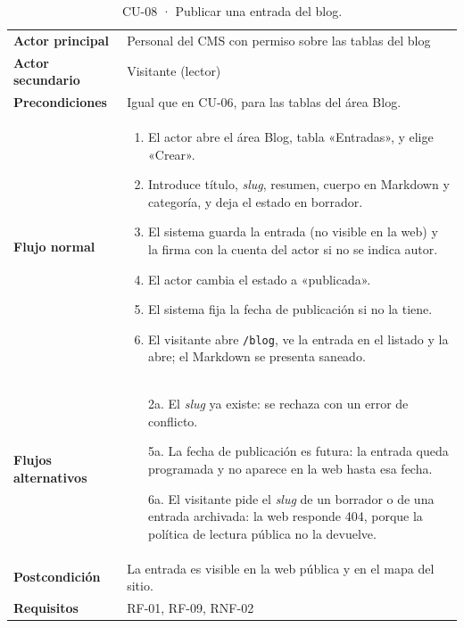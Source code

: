 {\footnotesize
\begin{xltabular}{\textwidth}{@{}>{\bfseries}p{2.6cm}X@{}}
  \caption{CU-08 · Publicar una entrada del blog.}\label{tab:ana-cu08}\\
    \toprule
    Actor principal & Personal del CMS con permiso sobre las tablas del blog \\
    Actor secundario & Visitante (lector) \\
    Precondiciones & Igual que en CU-06, para las tablas del área Blog. \\
    \midrule
    Flujo normal &
      \begin{enumerate}[nosep,leftmargin=*]
        \item El actor abre el área Blog, tabla «Entradas», y elige «Crear».
        \item Introduce título, \textit{slug}, resumen, cuerpo en Markdown y categoría, y deja el estado en borrador.
        \item El sistema guarda la entrada (no visible en la web) y la firma con la cuenta del actor si no se indica autor.
        \item El actor cambia el estado a «publicada».
        \item El sistema fija la fecha de publicación si no la tiene.
        \item El visitante abre \texttt{/blog}, ve la entrada en el listado y la abre; el Markdown se presenta saneado.
      \end{enumerate} \\
    \midrule
    Flujos alternativos &
      \begin{itemize}[nosep,leftmargin=*]
        \item[2a.] El \textit{slug} ya existe: se rechaza con un error de conflicto.
        \item[5a.] La fecha de publicación es futura: la entrada queda programada y no aparece en la web hasta esa fecha.
        \item[6a.] El visitante pide el \textit{slug} de un borrador o de una entrada archivada: la web responde 404, porque la política de lectura pública no la devuelve.
      \end{itemize} \\
    \midrule
    Postcondición & La entrada es visible en la web pública y en el mapa del sitio. \\
    Requisitos & RF-01, RF-09, RNF-02 \\
    \bottomrule
\end{xltabular}}

